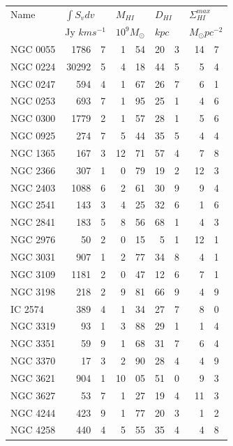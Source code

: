 \documentclass[usenatbib,useAMS]{mnras}
\begin{document}
\begin{table}
\begin{tabular}{lr@{.}lr@{.}lr@{.}lr@{.}l}
\hline
Name &\multicolumn{2}{l}{$\int S_{v}dv$}&\multicolumn{2}{l}{$M_{HI}$}&\multicolumn{2}{l}{$D_{HI}$}&\multicolumn{2}{l}{$\Sigma_{HI}^{max}$} \\
& \multicolumn{2}{l}{Jy $ km s^{-1}$}&\multicolumn{2}{l}{$10^{9} M_{\odot}$}&\multicolumn{2}{l}{$kpc$}&\multicolumn{2}{l}{$M_{\odot}pc^{-2}$} \\
\hline
NGC 0055	&1786&7   &1&54	&20&3	              & 14&7 \\
NGC 0224	&30292&5   &4&18	&44&5	          & 5&4 \\
NGC 0247	&594&4	    &1&67   &26&7	         & 6&1 \\
NGC 0253	&693&7       &1&95	&25&1              & 4&6 \\
NGC 0300	&1779&2	    &1&57	&28&1            & 5&6   \\
NGC 0925	&274&7	    &5&44	&35&5        & 4&4  \\
NGC 1365	&167&3	    &12&71	&57&4          & 7&8  \\
NGC 2366	&307&1	    &0&79	&19&2	         & 12&3  \\
NGC 2403	&1088&6	    &2&61	&30&9	  	     & 9&4  \\
NGC 2541	&143&3	    &4&25	&32&6          & 1&6  \\
NGC 2841	&183&5	    &8&56	&68&1         & 4&3  \\
NGC 2976	&50&2         &0&15	&5&1          & 12&1 \\
NGC 3031	&907&1	    &2&77	&34&8     	& 4&1 \\
NGC 3109	&1181&2	    &0&47	&12&6           & 7&1 \\
NGC 3198	&218&2	    &9&81	&66&9           & 4&9 \\
IC 2574	     &389&4	 &1&34	&27&7            & 8&0\\
NGC 3319	&93&1          &3&88	&29&1         & 1&4 \\
NGC 3351	&59&9	         &1&68	&31&7        	& 6&4 \\
NGC 3370	&17&3	         &2&90	&28&4         & 4&9  \\
NGC 3621	&904&1	   &10&05	&51&0	        & 9&3  \\
NGC 3627	&53&7         &1&27	&19&4         & 11&3  \\
NGC 4244	&423&9	   &1&77	&20&3           & 1&2  \\
NGC 4258	&440&4	   &5&55	&35&4            & 4&8   \\

\end{tabular}
\end{table}
\end{document}
